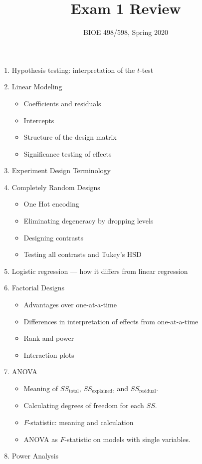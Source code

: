 \documentclass[wide,pal,11pt]{pajarticle}
\title{Exam 1 Review}
\date{BIOE 498/598, Spring 2020}
\begin{document}
\maketitle

\begin{enumerate}
	\item Hypothesis testing: interpretation of the $t$-test
	\item Linear Modeling
	\begin{itemize}
		\item Coefficients and residuals
		\item Intercepts
		\item Structure of the design matrix
		\item Significance testing of effects
	\end{itemize}
	\item Experiment Design Terminology
	\item Completely Random Designs
	\begin{itemize}
		\item One Hot encoding
		\item Eliminating degeneracy by dropping levels
		\item Designing contrasts
		\item Testing all contrasts and Tukey's HSD
	\end{itemize}
	\item Logistic regression --- how it differs from linear regression
	\item Factorial Designs
	\begin{itemize}
		\item Advantages over one-at-a-time
		\item Differences in interpretation of effects from one-at-a-time
		\item Rank and power
		\item Interaction plots
	\end{itemize}
	\item ANOVA
	\begin{itemize}
		\item Meaning of $SS_\mathrm{total}$, $SS_\mathrm{explained}$, and $SS_\mathrm{residual}$.
		\item Calculating degrees of freedom for each $SS$.
		\item $F$-statistic: meaning and calculation
		\item ANOVA as $F$-statistic on models with single variables.
	\end{itemize}
	\item Power Analysis

\end{enumerate}
\end{document}
